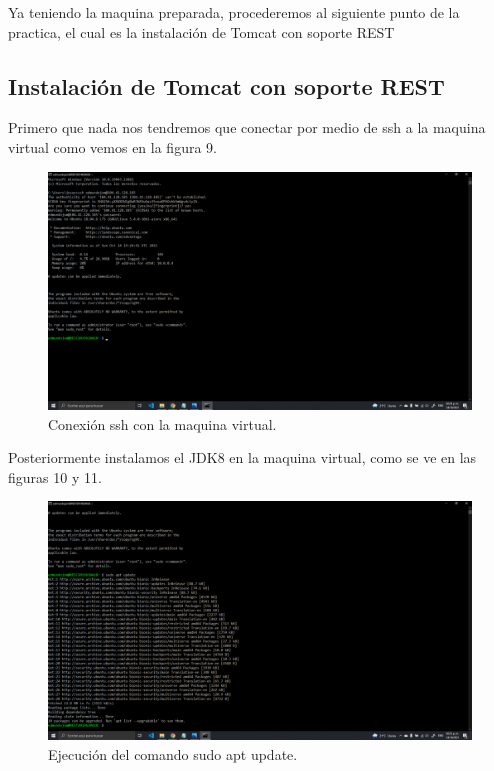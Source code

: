 \documentclass[11pt]{article}
\begin{document}
		Ya teniendo la maquina preparada, procederemos al siguiente punto de la practica, el cual es la instalación de Tomcat con soporte REST
		\subsection{Instalación de Tomcat con soporte REST}
		Primero que nada nos tendremos que conectar por medio de ssh a la maquina virtual como vemos en la figura 9.
		\begin{figure}[H]
			\centering
			\includegraphics[scale=0.34]{resources/conexionssh.png}
			\caption{Conexión ssh con la maquina virtual.}\label{fig:picture}
		\end{figure}
		Posteriormente instalamos el JDK8 en la maquina virtual, como se ve en las figuras 10 y 11.
		\begin{figure}[H]
			\centering
			\includegraphics[scale=0.34]{resources/p2.1.png}
			\caption{Ejecución del comando sudo apt update.}\label{fig:picture}
		\end{figure}
\end{document}
